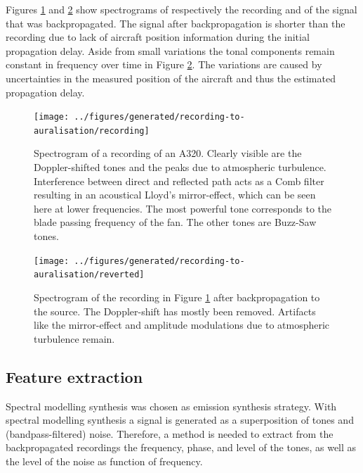 Figures \ref{fig:recording} and \ref{fig:backpropagated} show spectrograms of
respectively the recording and of the signal that was backpropagated. The signal
after backpropagation is shorter than the recording due to lack of aircraft
position information during the initial propagation delay.
Aside from small variations the tonal components remain constant in frequency
over time in Figure \ref{fig:backpropagated}. The variations are caused
by uncertainties in the measured position of the aircraft and thus the estimated
propagation delay.


\begin{figure}[H]
  \centering
  \texttt{[image: ../figures/generated/recording-to-auralisation/recording]}
  \caption{
    Spectrogram of a recording of an A320. Clearly visible are the
    Doppler-shifted tones and the peaks due to atmospheric turbulence.
    Interference between direct and reflected path acts as a Comb filter resulting
    in an acoustical Lloyd's mirror-effect, which can be seen here at lower
    frequencies. The most powerful tone corresponds to the blade passing frequency
    of the fan. The other tones are Buzz-Saw tones.}
  \label{fig:recording}
\end{figure}

\begin{figure}[H]
  \centering
  \texttt{[image: ../figures/generated/recording-to-auralisation/reverted]}
  \caption{Spectrogram of the recording in Figure \ref{fig:recording} after backpropagation to the source. The Doppler-shift has mostly been removed. Artifacts like the mirror-effect and amplitude modulations due to atmospheric turbulence remain.}
  \label{fig:backpropagated}
\end{figure}

\subsection{Feature extraction}
Spectral modelling synthesis was chosen as emission synthesis strategy. With
spectral modelling synthesis a signal is generated as a superposition of tones
and (bandpass-filtered) noise.
Therefore, a method is needed to extract from the backpropagated recordings the
frequency, phase, and level of the tones, as well as the level of the noise as
function of frequency.

